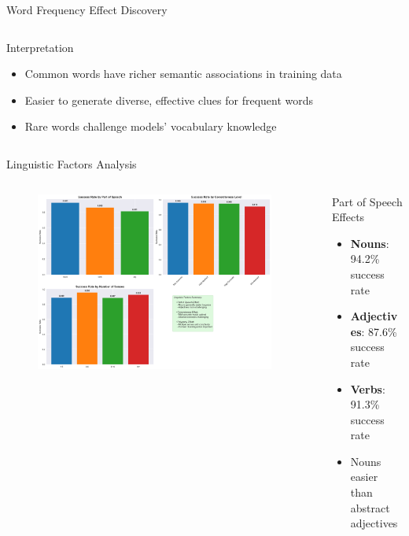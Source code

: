 \documentclass[aspectratio=169]{beamer}
\begin{document}
\begin{frame}{Word Frequency Effect Discovery}
\begin{columns}
\begin{column}{0.5\textwidth}
\begin{block}{Interpretation}
\begin{itemize}
    \item Common words have richer semantic associations in training data
    \item Easier to generate diverse, effective clues for frequent words
    \item Rare words challenge models' vocabulary knowledge
\end{itemize}
\end{block}
\end{column}
\end{columns}
\end{frame}

\begin{frame}{Linguistic Factors Analysis}
\begin{columns}
\begin{column}{0.5\textwidth}
\begin{figure}[h]
\centering
\includegraphics[width=0.95\textwidth]{comprehensive_figures/figure3_linguistic.png}
\end{figure}
\end{column}

\begin{column}{0.5\textwidth}
\begin{block}{Part of Speech Effects}
\begin{itemize}
    \item \textbf{Nouns}: 94.2\% success rate
    \item \textbf{Adjectives}: 87.6\% success rate
    \item \textbf{Verbs}: 91.3\% success rate
    \item Nouns easier than abstract adjectives
\end{itemize}
\end{block}


\end{column}
\end{columns}
\end{frame}
\end{document}
